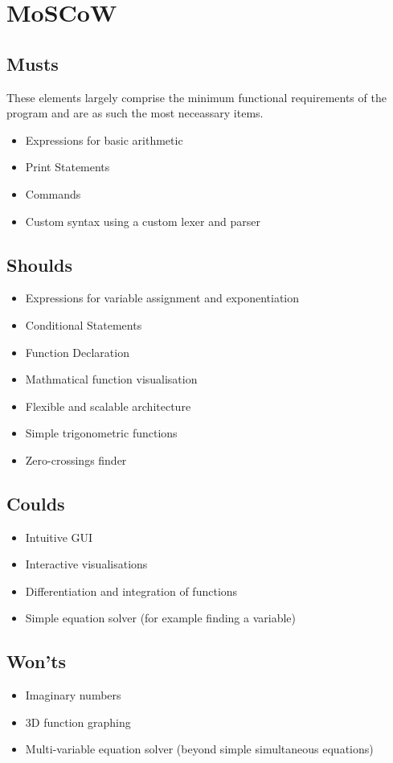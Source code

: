\documentclass[a4paper, oneside, 11pt]{report}
\begin{document}
\section{MoSCoW}
\subsection{Musts}

These elements largely comprise the minimum functional requirements of the program and are as such the most neceassary items.
\begin{itemize}
	\item Expressions for basic arithmetic
	\item Print Statements
	\item Commands
	\item Custom syntax using a custom lexer and parser
\end{itemize}

\subsection{Shoulds}

\begin{itemize}
	\item Expressions for variable assignment and exponentiation
	\item Conditional Statements
	\item Function Declaration
	\item Mathmatical function visualisation
	\item Flexible and scalable architecture
	\item Simple trigonometric functions
	\item Zero-crossings finder
\end{itemize}

\subsection{Coulds}
\begin{itemize}
	\item Intuitive GUI
	\item Interactive visualisations
	\item Differentiation and integration of functions
	\item Simple equation solver (for example finding a variable)
\end{itemize}

\subsection{Won'ts}
\begin{itemize}
	\item Imaginary numbers
	\item 3D function graphing
	\item Multi-variable equation solver (beyond simple simultaneous equations)
\end{itemize}
\end{document}
